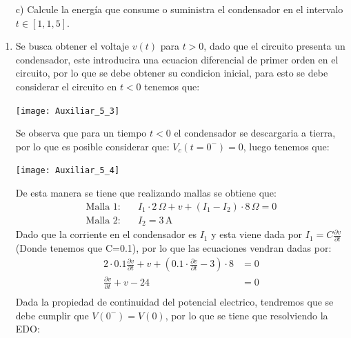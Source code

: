 \documentclass[
  11pt,
  letterpaper,
   addpoints,
   answers
  ]{exam}
\begin{document}
\begin{questions}
\begin{enumerate}
        \item[c)] Calcule la energía que consume o suministra el condensador en el intervalo \( t \in [1, 1{,}5] \).
    \end{enumerate}
    \begin{solution}
        \begin{enumerate}
            \item Se busca obtener el voltaje $v(t)$ para $t > 0$, dado que el circuito presenta un condensador, este introducira una ecuacion diferencial de primer orden en el circuito, por lo que se debe obtener su condicion inicial, para esto se debe considerar el circuito en $t<0$ tenemos que:
            \begin{center}
                \texttt{[image: Auxiliar\_5\_3]}
            \end{center}
            Se observa que para un tiempo $t<0$ el condensador se descargaria a tierra, por lo que es posible considerar que:
            $V_{c}(t=0^{-})=0$, luego tenemos que:
            \begin{center}
                \texttt{[image: Auxiliar\_5\_4]}
            \end{center}
            De esta manera se tiene que realizando mallas se obtiene que:
            \begin{align}
                \text{Malla 1:} \quad & I_1 \cdot 2\,\Omega + v + (I_1 - I_2) \cdot 8\,\Omega = 0 \\
                \text{Malla 2:} \quad & I_2 = 3\,\text{A}
            \end{align}
            Dado que la corriente en el condensador es $I_{1}$ y esta viene dada por $I_{1}= C \frac{\partial v}{\partial t}$ (Donde tenemos que C=0.1), por lo que las ecuaciones vendran dadas por:
            \begin{align}
                2 \cdot 0.1 \frac{\partial v}{\partial t} + v + (0.1 \cdot \frac{\partial v}{\partial t} - 3) \cdot 8 &= 0\\
                 \frac{\partial v}{\partial t} + v - 24 &= 0\\ 
            \end{align}
            Dada la propiedad de continuidad del potencial electrico, tendremos que se debe cumplir que $V(0^{-})=V(0)$, por lo que se tiene que resolviendo la EDO:
            \begin{align}

\end{align}
\end{enumerate}
\end{solution}
\end{questions}
\end{document}
